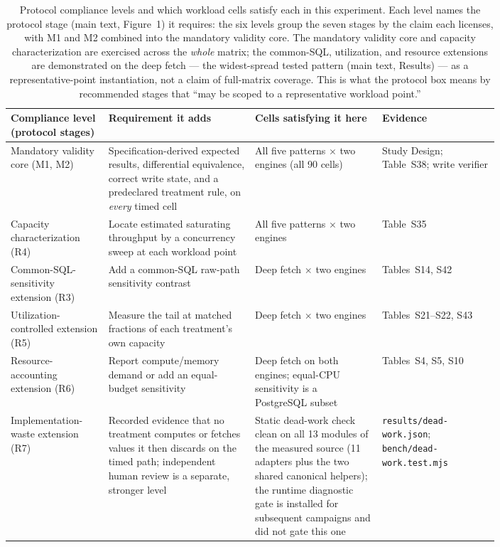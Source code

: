 \begin{table}[htbp]
  \centering
  \caption{Protocol compliance levels and which workload cells satisfy each in this experiment. Each
    level names the protocol stage (main text, Figure~1) it requires: the six levels group the seven stages by
    the claim each licenses, with M1 and M2 combined into the mandatory validity core. The
    mandatory validity core and capacity characterization are exercised across the \emph{whole}
    matrix; the common-SQL, utilization, and resource extensions are demonstrated on the deep fetch --- the widest-spread tested pattern
    (main text, Results) --- as a representative-point instantiation, not a claim of full-matrix
    coverage. This is what the protocol box means by recommended stages that ``may be scoped to a
    representative workload point.''}
  \label{tab:protocol_compliance}
  \begin{adjustbox}{max width=\textwidth}
  \begin{tabular}{l p{0.30\linewidth} p{0.26\linewidth} p{0.24\linewidth}}
    \toprule
    Compliance level (protocol stages) & Requirement it adds & Cells satisfying it here & Evidence \\
    \midrule
    Mandatory validity core (M1, M2) & Specification-derived expected results, differential equivalence, correct write state, and a
      predeclared treatment rule, on \emph{every} timed cell & All five patterns $\times$ two engines
      (all 90 cells) & Study Design; Table~S38; write verifier \\
    \midrule
    Capacity characterization (R4) & Locate estimated saturating throughput by a concurrency sweep at each workload
      point & All five patterns $\times$ two engines & Table~S35 \\
    \midrule
    Common-SQL-sensitivity extension (R3) & Add a common-SQL raw-path sensitivity contrast & Deep fetch $\times$ two engines & Tables~S14, S42 \\
    Utilization-controlled extension (R5) & Measure the tail at matched fractions of each treatment's own
      capacity & Deep fetch $\times$ two engines & Tables~S21--S22, S43 \\
    Resource-accounting extension (R6) & Report compute/memory demand or add an equal-budget sensitivity & Deep fetch on both
      engines; equal-CPU sensitivity is a PostgreSQL subset & Tables~S4, S5, S10 \\
    Implementation-waste extension (R7) & Recorded evidence that no treatment computes or fetches values it then discards on the timed path; independent human review is a separate, stronger level & Static dead-work check clean on all 13 modules of the measured source (11 adapters plus the two shared canonical helpers); the runtime diagnostic gate is installed for subsequent campaigns and did not gate this one & \texttt{results/dead-work.json}; \texttt{bench/dead-work.test.mjs} \\
    \bottomrule
  \end{tabular}
  \end{adjustbox}
\end{table}
